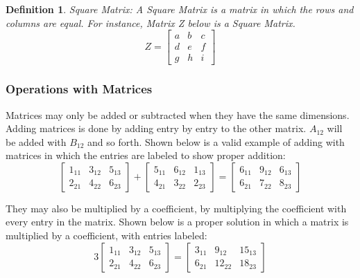 \documentclass[final,1p,12pt]{elsarticle}
\newtheorem{definition}{Definition}
\begin{document}
        \begin{definition}Square Matrix:
        A Square Matrix is a matrix in which the rows and columns are equal. For instance, Matrix Z below is a Square Matrix.
        \begin{equation}%
            Z =
            \begin{bmatrix}
                a & b & c\\
                d & e & f\\
                g & h & i
            \end{bmatrix}
        \end{equation}
        \end{definition}
        
        \subsubsection{Operations with Matrices}
        Matrices may only be added or subtracted when they have the same dimensions. Adding matrices is done by adding entry by entry to the other matrix. $A_{12}$ will be added with $B_{12}$ and so forth. Shown below is a valid example of adding with matrices in which the entries are labeled to show proper addition:
        \begin{equation}
            \begin{bmatrix}
                1_{11} & 3_{12} & 5_{13} \\
                2_{21} & 4_{22} & 6_{23}
            \end{bmatrix}
            +
            \begin{bmatrix}
                5_{11} & 6_{12} & 1_{13} \\
                4_{21} & 3_{22} & 2_{23}
            \end{bmatrix}
            =
            \begin{bmatrix}
                6_{11} & 9_{12} & 6_{13} \\
                6_{21} & 7_{22} & 8_{23}
            \end{bmatrix}
        \end{equation}
        
        They may also be multiplied by a coefficient, by multiplying the coefficient with every entry in the matrix. Shown below is a proper solution in which a matrix is multiplied by a coefficient, with entries labeled:
         \begin{equation}
         3
            \begin{bmatrix}
                1_{11} & 3_{12} & 5_{13} \\
                2_{21} & 4_{22} & 6_{23}
            \end{bmatrix}
        =
            \begin{bmatrix}
                3_{11} & 9_{12} & 15_{13} \\
                6_{21} & 12_{22} & 18_{23}
            \end{bmatrix}
        \end{equation}
        
\end{document}
